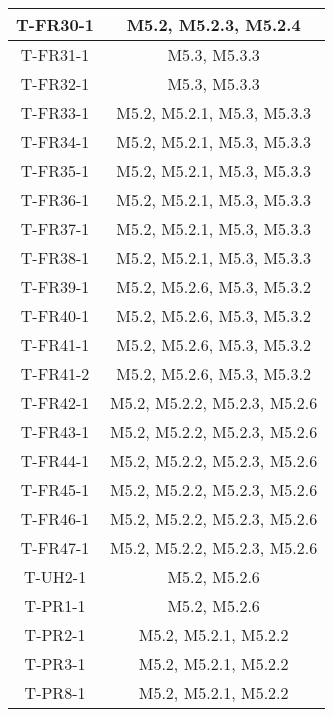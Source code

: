 \documentclass[12pt, titlepage]{article}
\begin{document}
\begin{center}
\begin{longtable}{ |c|c| }
        \hline
        T-FR30-1    & M5.2, M5.2.3, M5.2.4 \\ 
        \hline
        T-FR31-1    & M5.3, M5.3.3 \\ 
        \hline
        T-FR32-1    & M5.3, M5.3.3 \\ 
        \hline
        T-FR33-1    & M5.2, M5.2.1, M5.3, M5.3.3 \\ 
        \hline
        T-FR34-1    & M5.2, M5.2.1, M5.3, M5.3.3 \\ 
        \hline
        T-FR35-1    & M5.2, M5.2.1, M5.3, M5.3.3 \\ 
        \hline
        T-FR36-1    & M5.2, M5.2.1, M5.3, M5.3.3 \\ 
        \hline
        T-FR37-1    & M5.2, M5.2.1, M5.3, M5.3.3 \\ 
        \hline
        T-FR38-1    & M5.2, M5.2.1, M5.3, M5.3.3 \\ 
        \hline
        T-FR39-1    & M5.2, M5.2.6, M5.3, M5.3.2 \\ 
        \hline
        T-FR40-1    & M5.2, M5.2.6, M5.3, M5.3.2 \\ 
        \hline
        T-FR41-1    & M5.2, M5.2.6, M5.3, M5.3.2 \\
        T-FR41-2    & M5.2, M5.2.6, M5.3, M5.3.2 \\
        \hline
        T-FR42-1    & M5.2, M5.2.2, M5.2.3, M5.2.6 \\
        \hline
        T-FR43-1    & M5.2, M5.2.2, M5.2.3, M5.2.6 \\ 
        \hline
        T-FR44-1    & M5.2, M5.2.2, M5.2.3, M5.2.6 \\
        \hline
        T-FR45-1    & M5.2, M5.2.2, M5.2.3, M5.2.6 \\
        \hline
        T-FR46-1    & M5.2, M5.2.2, M5.2.3, M5.2.6 \\
        \hline
        T-FR47-1    & M5.2, M5.2.2, M5.2.3, M5.2.6 \\
        \hline
        T-UH2-1     & M5.2, M5.2.6 \\ 
        \hline
        T-PR1-1     & M5.2, M5.2.6 \\ 
        \hline
        T-PR2-1     & M5.2, M5.2.1, M5.2.2 \\ 
        \hline
        T-PR3-1     & M5.2, M5.2.1, M5.2.2 \\ 
        \hline
        T-PR8-1     & M5.2, M5.2.1, M5.2.2 \\ 
        \hline
    \end{longtable}
\end{center}
\end{document}

